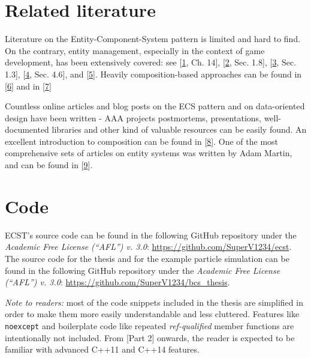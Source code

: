 \documentclass[oneside, 12pt, a4paper, openany]{book}
\begin{document}
\section{Related literature}\label{related-literature}

Literature on the Entity-Component-System pattern is limited and hard to
find. On the contrary, entity management, especially in the context of
game development, has been extensively covered: see
{[}\protect\hyperlink{ref-gregory2014game}{1}, Ch. 14{]},
{[}\protect\hyperlink{ref-game_programming_gems_4}{2}, Sec. 1.8{]},
{[}\protect\hyperlink{ref-game_programming_gems_5}{3}, Sec. 1.3{]},
{[}\protect\hyperlink{ref-game_programming_gems_6}{4}, Sec. 4.6{]}, and
{[}\protect\hyperlink{ref-doherty2003software}{5}{]}. Heavily
composition-based approaches can be found in
{[}\protect\hyperlink{ref-Wiebusch:2012}{6}{]} and in
{[}\protect\hyperlink{ref-6658092}{7}{]}

Countless online articles and blog posts on the ECS pattern and on
data-oriented design have been written - AAA projects postmortems,
presentations, well-documented libraries and other kind of valuable
resources can be easily found. An excellent introduction to composition
can be found in
{[}\protect\hyperlink{ref-robertnystorm_gpp_component}{8}{]}. One of the
most comprehensive sets of articles on entity systems was written by
Adam Martin, and can be found in
{[}\protect\hyperlink{ref-tmachine_es_category}{9}{]}.

\section{Code}\label{code}

ECST's source code can be found in the following GitHub repository under
the \emph{Academic Free License (``AFL'') v. 3.0}:
\url{https://github.com/SuperV1234/ecst}. The source code for the thesis
and for the example particle simulation can be found in the following
GitHub repository under the \emph{Academic Free License (``AFL'') v.
3.0}: \url{https://github.com/SuperV1234/bcs_thesis}.

\emph{Note to readers:} most of the code snippets included in the thesis
are simplified in order to make them more easily understandable and less
cluttered. Features like
\texttt{noexcept}
and boilerplate code like repeated \emph{ref-qualified} member functions
are intentionally not included. From {[}Part 2{]} onwards, the reader is
expected to be familiar with advanced C++11 and C++14 features.
\end{document}
